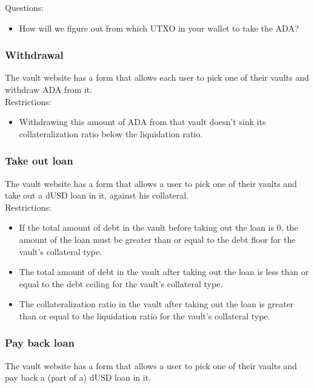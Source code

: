 \documentclass{article} %
\begin{document}
Questions:
\begin{itemize}
  \item How will we figure out from which UTXO in your wallet to take the ADA?
\end{itemize}

\subsubsection{Withdrawal}

The vault website has a form that allows each user to pick one of their vaults
and withdraw ADA from it. \\

Restrictions:
\begin{itemize}
  \item Withdrawing this amount of ADA from that vault doesn't sink its
    collateralization ratio below the liquidation ratio.
\end{itemize}

\subsubsection{Take out loan}

The vault website has a form that allows a user to pick one of their vaults and
take out a dUSD loan in it, against his collateral. \\

Restrictions:
\begin{itemize}
  \item If the total amount of debt in the vault before taking out the loan is 0,
    the amount of the loan must be greater than or equal to the debt floor for the
    vault's collateral type.
  \item The total amount of debt in the vault after taking out the loan is less than or
    equal to the debt ceiling for the vault's collateral type.
  \item The collateralization ratio in the vault after taking out the loan is greater than
    or equal to the liquidation ratio for the vault's collateral type.
\end{itemize}

\subsubsection{Pay back loan}

The vault website has a form that allows a user to pick one of their vaults and
pay back a (part of a) dUSD loan in it. \\
\end{document}
